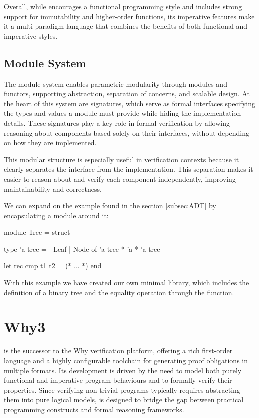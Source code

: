 Overall, while \ocaml encourages a functional programming style and includes strong support for immutability and higher-order functions, 
its imperative features make it a multi-paradigm language that combines the benefits of both functional and imperative styles.

\subsection{Module System}
\label{subsec:ModuleSystem}

The module system enables parametric modularity through modules and functors, supporting abstraction, separation of concerns, and 
scalable design. At the heart of this system are signatures, which serve as formal interfaces specifying the types and values a 
module must provide while hiding the implementation details. These signatures play a key role in formal verification by allowing 
reasoning about components based solely on their interfaces, without depending on how they are implemented.

This modular structure is especially useful in verification contexts because it clearly separates the interface from the 
implementation. This separation makes it easier to reason about and verify each component independently, improving 
maintainability and correctness.

We can expand on the example found in the section \ref{subsec:ADT} by encapsulating a module around it:

\begin{ocamlenv}
module Tree = struct

  type 'a tree =
    | Leaf
    | Node of 'a tree * 'a * 'a tree

  let rec cmp t1 t2 = (* ... *)
end
\end{ocamlenv}

With this example we have created our own minimal  library, which includes the definition of a binary tree and the equality 
operation through the  function.

\section{Why3}
\label{sec:Why3}

\whythree is the successor to the Why verification platform, offering a rich first-order language and a highly configurable 
toolchain for generating proof obligations in multiple formats. Its development is driven by the need to model both purely 
functional and imperative program behaviours and to formally verify their properties. Since verifying non-trivial programs 
typically requires abstracting them into pure logical models, \whythree is designed to bridge the gap between practical programming 
constructs and formal reasoning frameworks.

